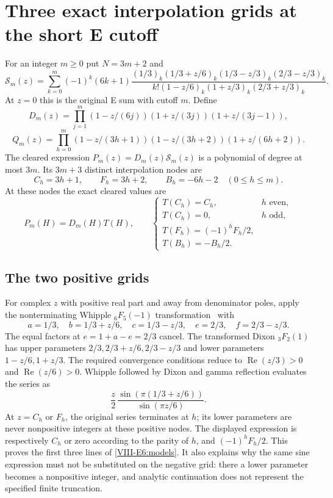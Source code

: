 \documentclass[11pt,letterpaper]{article}
\numberwithin{equation}{section}
\begin{document}
\section{Three exact interpolation grids at the short E cutoff}\label{loc-VIII-2}
\label{VIII-sec:E6models}
For an integer $m\ge0$ put $N=3m+2$ and
\[
 \mathcal S_m(z)=\sum_{k=0}^{m}(-1)^k(6k+1)
 \frac{(1/3)_k(1/3+z/6)_k(1/3-z/3)_k(2/3-z/3)_k}
 {k!(1-z/6)_k(1+z/3)_k(2/3+z/3)_k}.
\]
At $z=0$ this is the original E sum with cutoff $m$.
Define
\[
 D_m(z)=\prod_{j=1}^{m}
 (1-z/(6j))(1+z/(3j))(1+z/(3j-1)),
\]
\[
 Q_m(z)=\prod_{h=0}^{m}
 (1-z/(3h+1))(1-z/(3h+2))(1+z/(6h+2)).
\]
The cleared expression $P_m(z)=D_m(z)\mathcal S_m(z)$ is a
polynomial of degree at most $3m$. Its $3m+3$ distinct interpolation
nodes are
\[
 C_h=3h+1,\qquad F_h=3h+2,\qquad B_h=-6h-2
 \quad(0\le h\le m).
\]
At these nodes the exact cleared values are
\begin{equation}\label{VIII-E6:models}
 P_m(H)=D_m(H)T(H),\qquad
 \begin{cases}
 T(C_h)=C_h,&h\text{ even},\\
 T(C_h)=0,&h\text{ odd},\\
 T(F_h)=(-1)^hF_h/2,\\
 T(B_h)=-B_h/2.
 \end{cases}
\end{equation}

\subsection{The two positive grids}
For complex $z$ with positive real part and away from denominator
poles, apply the nonterminating Whipple ${}_6F_5(-1)$ transformation~\cite{VIII-Bailey}
with
\[
 a=1/3,\quad b=1/3+z/6,\quad c=1/3-z/3,
 \quad e=2/3,\quad f=2/3-z/3.
\]
The equal factors at $e=1+a-e=2/3$ cancel. The transformed Dixon
${}_3F_2(1)$ has upper parameters
$2/3,2/3+z/6,2/3-z/3$ and lower parameters
$1-z/6,1+z/3$.
The required convergence conditions reduce to
$\operatorname{Re}(z/3)>0$ and $\operatorname{Re}(z/6)>0$.
Whipple followed by Dixon and gamma reflection evaluates the series as
\[
 \frac z2\,
 \frac{\sin(\pi(1/3+z/6))}{\sin(\pi z/6)}.
\]
At $z=C_h$ or $F_h$, the original series terminates at $h$;
its lower parameters are never nonpositive integers at these
positive nodes. The displayed expression is respectively
$C_h$ or zero according to the parity of $h$, and
$(-1)^hF_h/2$. This proves the first three lines of
\eqref{VIII-E6:models}. It also explains why the same sine expression
must not be substituted on the negative grid: there a lower
parameter becomes a nonpositive integer, and analytic continuation
does not represent the specified finite truncation.
\end{document}
